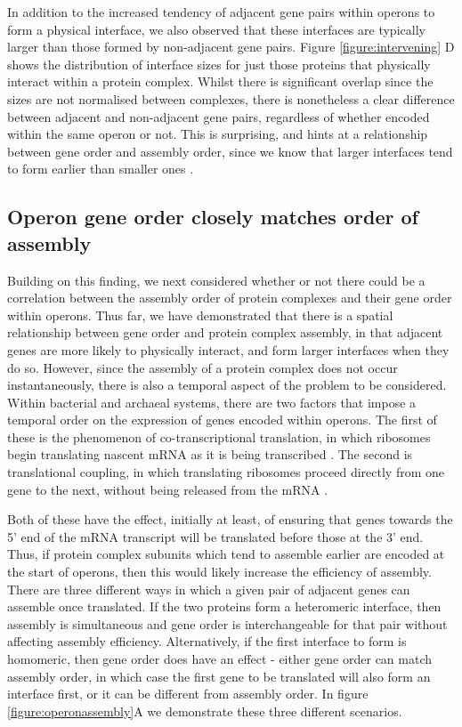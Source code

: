 \documentclass[a4paper,11pt,twoside,openright]{scrbook}
\begin{document}
In addition to the increased tendency of adjacent gene pairs within operons to form a physical interface, we also observed that these interfaces are typically larger than those formed by non-adjacent gene pairs. Figure \ref{figure:intervening} D shows the distribution of interface sizes for just those proteins that physically interact within a protein complex. Whilst there is significant overlap since the sizes are not normalised between complexes, there is nonetheless a clear difference between adjacent and non-adjacent gene pairs, regardless of whether encoded within the same operon or not. This is surprising, and hints at a relationship between gene order and assembly order, since we know that larger interfaces tend to form earlier than smaller ones \cite{Levy2008,Marsh2013,Macek2017}.

\subsection{Operon gene order closely matches order of assembly}
Building on this finding, we next considered whether or not there could be a correlation between the assembly order of protein complexes and their gene order within operons. Thus far, we have demonstrated that there is a spatial relationship between gene order and protein complex assembly, in that adjacent genes are more likely to physically interact, and form larger interfaces when they do so. However, since the assembly of a protein complex does not occur instantaneously, there is also a temporal aspect of the problem to be considered. Within bacterial and archaeal systems, there are two factors that impose a temporal order on the expression of genes encoded within operons. The first of these is the phenomenon of co-transcriptional translation, in which ribosomes begin translating nascent mRNA as it is being transcribed \cite{Byrne1964,Gowrishankar2004,Kohler2017}. The second is translational coupling, in which translating ribosomes proceed directly from one gene to the next, without being released from the mRNA \cite{Oppenheim1980,Levin-Karp2013}.

Both of these have the effect, initially at least, of ensuring that genes towards the 5' end of the mRNA transcript will be translated before those at the 3' end. Thus, if protein complex subunits which tend to assemble earlier are encoded at the start of operons, then this would likely increase the efficiency of assembly. There are three different ways in which a given pair of adjacent genes can assemble once translated. If the two proteins form a heteromeric interface, then assembly is simultaneous and gene order is interchangeable for that pair without affecting assembly efficiency. Alternatively, if the first interface to form is homomeric, then gene order does have an effect - either gene order can match assembly order, in which case the first gene to be translated will also form an interface first, or it can be different from assembly order. In figure \ref{figure:operonassembly}A we demonstrate these three different scenarios.
\end{document}
